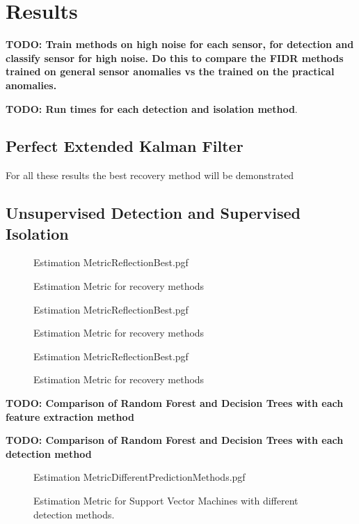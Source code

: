\chapter{Results}
\label{chap:Results}

\textbf{TODO: Train methods on high noise for each sensor, for detection and classify sensor for high noise. Do this to compare the FIDR methods trained on general sensor anomalies vs the trained on the practical anomalies.}

\textbf{TODO: Run times for each detection and isolation method}.

\section{Perfect Extended Kalman Filter}
For all these results the best recovery method will be demonstrated

\section{Unsupervised Detection and Supervised Isolation}
\begin{figure}[!htb]
	\centering
	{Estimation MetricReflectionBest.pgf}
	
	\caption{Estimation Metric for recovery methods}
	\label{fig:RecoveryComparisonMagnetic}
\end{figure}

\begin{figure}[!htb]
	\centering
	{Estimation MetricReflectionBest.pgf}
	
	\caption{Estimation Metric for recovery methods}
	\label{fig:RecoveryComparisonMagnetic}
\end{figure}

\begin{figure}[!htb]
	\centering
	{Estimation MetricReflectionBest.pgf}
	
	\caption{Estimation Metric for recovery methods}
	\label{fig:RecoveryComparisonMagnetic}
\end{figure}

\textbf{TODO: Comparison of Random Forest and Decision Trees with each feature extraction method}

\textbf{TODO: Comparison of Random Forest and Decision Trees with each detection method}

\begin{figure}[!htb]
	\centering
	{Estimation MetricDifferentPredictionMethods.pgf}
	
	\caption{Estimation Metric for Support Vector Machines with different detection methods.}
	\label{fig:SVMCompareDetectionMethods}
\end{figure}

